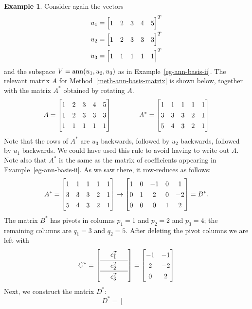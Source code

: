 \documentclass[reqno]{amsart}
\theoremstyle{definition}
\newtheorem{example}[theorem]{Example}
\begin{document}
\begin{example}\label{eg-ann-basis-matrix-ii}
 Consider again the vectors
 \begin{align*}
  u_1 &= \bbm 1 & 2 & 3 & 4 & 5 \ebm^T \\
  u_2 &= \bbm 1 & 2 & 3 & 3 & 3 \ebm^T \\
  u_3 &= \bbm 1 & 1 & 1 & 1 & 1 \ebm^T
 \end{align*}
 and the subspace $V=\operatorname{ann}(u_1,u_2,u_3)$ as in
 Example~\ref{eg-ann-basis-ii}.  The relevant matrix $A$ for
 Method~\ref{meth-ann-basis-matrix} is shown below, together with the matrix
 $A^*$ obtained by rotating $A$.
 \[ A = \bbm
      1 & 2 & 3 & 4 & 5 \\
      1 & 2 & 3 & 3 & 3 \\
      1 & 1 & 1 & 1 & 1
    \ebm \hspace{4em}
    A^* = \bbm
      1 & 1 & 1 & 1 & 1 \\
      3 & 3 & 3 & 2 & 1 \\
      5 & 4 & 3 & 2 & 1
    \ebm
 \]
 Note that the rows of $A^*$ are $u_3$ backwards, followed by $u_2$
 backwards, followed by $u_1$ backwards.  We could have used this rule
 to avoid having to write out $A$.  Note also that $A^*$ is the same
 as the matrix of coefficients appearing in
 Example~\ref{eg-ann-basis-ii}.  As we saw there, it row-reduces as
 follows:
 \[ A^* =
    \bbm
      1 & 1 & 1 & 1 & 1 \\
      3 & 3 & 3 & 2 & 1 \\
      5 & 4 & 3 & 2 & 1
    \ebm
    \to
    \bbm
      1 & 0 &-1 & 0 & 1 \\
      0 & 1 & 2 & 0 &-2 \\
      0 & 0 & 0 & 1 & 2
    \ebm
   = B^*.
 \]
 The matrix $B^*$ has pivots in columns $p_1=1$ and
 $p_2=2$ and $p_3=4$; the remaining columns are $q_1=3$ and $q_2=5$.
 After deleting the pivot columns we are left with
 \[ C^* = {\renewcommand{\arraystretch}{1.3}
      \left[\begin{array}{ccc}
        & c_1^T & \\ \hline
        & c_2^T & \\ \hline
        & c_3^T &
      \end{array}\right]}
      = \bbm -1 & -1 \\
              2 & -2 \\
              0 &  2 \ebm
 \]
  Next, we construct the matrix $D^*$:
  \[ D^* =
      \left[\begin{array}{c|c|c|c|c}
        &&&& \\

\end{array}\]
\end{example}
\end{document}
